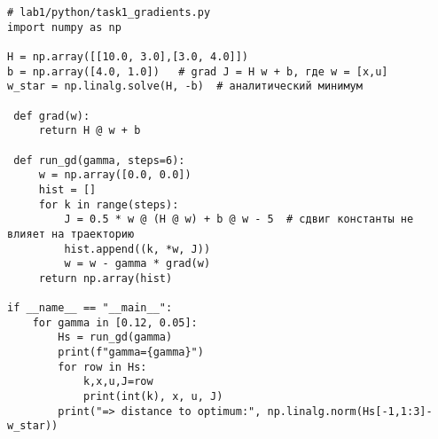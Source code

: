 \begin{lstlisting}[caption={Градиентный спуск: две стратегии шага и первые итерации},label={lst:gd}]
# lab1/python/task1_gradients.py
import numpy as np

H = np.array([[10.0, 3.0],[3.0, 4.0]])
b = np.array([4.0, 1.0])   # grad J = H w + b, где w = [x,u]
w_star = np.linalg.solve(H, -b)  # аналитический минимум

 def grad(w):
     return H @ w + b

 def run_gd(gamma, steps=6):
     w = np.array([0.0, 0.0])
     hist = []
     for k in range(steps):
         J = 0.5 * w @ (H @ w) + b @ w - 5  # сдвиг константы не влияет на траекторию
         hist.append((k, *w, J))
         w = w - gamma * grad(w)
     return np.array(hist)

if __name__ == "__main__":
    for gamma in [0.12, 0.05]:
        Hs = run_gd(gamma)
        print(f"gamma={gamma}")
        for row in Hs:
            k,x,u,J=row
            print(int(k), x, u, J)
        print("=> distance to optimum:", np.linalg.norm(Hs[-1,1:3]-w_star))
\end{lstlisting}
